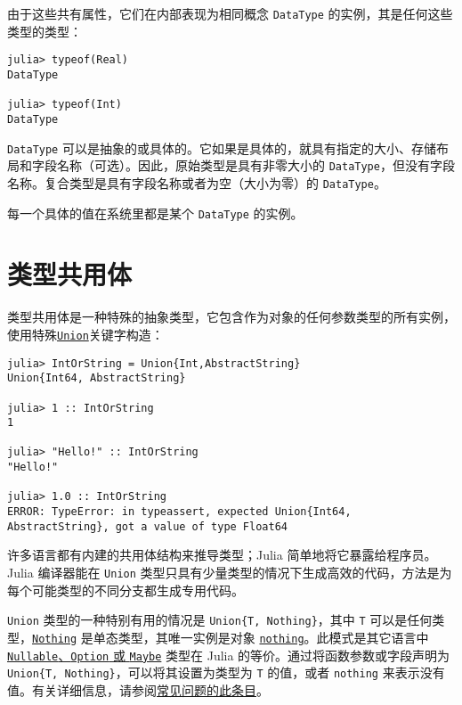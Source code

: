 由于这些共有属性，它们在内部表现为相同概念 \texttt{DataType} 的实例，其是任何这些类型的类型：




\begin{verbatim}
julia> typeof(Real)
DataType

julia> typeof(Int)
DataType
\end{verbatim}



\texttt{DataType} 可以是抽象的或具体的。它如果是具体的，就具有指定的大小、存储布局和字段名称（可选）。因此，原始类型是具有非零大小的 \texttt{DataType}，但没有字段名称。复合类型是具有字段名称或者为空（大小为零）的 \texttt{DataType}。



每一个具体的值在系统里都是某个 \texttt{DataType} 的实例。



\hypertarget{5785180493438363730}{}


\section{类型共用体}



类型共用体是一种特殊的抽象类型，它包含作为对象的任何参数类型的所有实例，使用特殊\hyperlink{5087820771052303592}{\texttt{Union}}关键字构造：




\begin{verbatim}
julia> IntOrString = Union{Int,AbstractString}
Union{Int64, AbstractString}

julia> 1 :: IntOrString
1

julia> "Hello!" :: IntOrString
"Hello!"

julia> 1.0 :: IntOrString
ERROR: TypeError: in typeassert, expected Union{Int64, AbstractString}, got a value of type Float64
\end{verbatim}



许多语言都有内建的共用体结构来推导类型；Julia 简单地将它暴露给程序员。Julia 编译器能在 \texttt{Union} 类型只具有少量类型\footnotemark[1]的情况下生成高效的代码，方法是为每个可能类型的不同分支都生成专用代码。



\texttt{Union} 类型的一种特别有用的情况是 \texttt{Union\{T, Nothing\}}，其中 \texttt{T} 可以是任何类型，\hyperlink{13508459519898889544}{\texttt{Nothing}} 是单态类型，其唯一实例是对象 \hyperlink{9331422207248206047}{\texttt{nothing}}。此模式是其它语言中 \href{https://en.wikipedia.org/wiki/Nullable\_type}{\texttt{Nullable}、\texttt{Option} 或 \texttt{Maybe}} 类型在 Julia 的等价。通过将函数参数或字段声明为 \texttt{Union\{T, Nothing\}}，可以将其设置为类型为 \texttt{T} 的值，或者 \texttt{nothing} 来表示没有值。有关详细信息，请参阅\hyperlink{11397816795210039176}{常见问题的此条目}。



